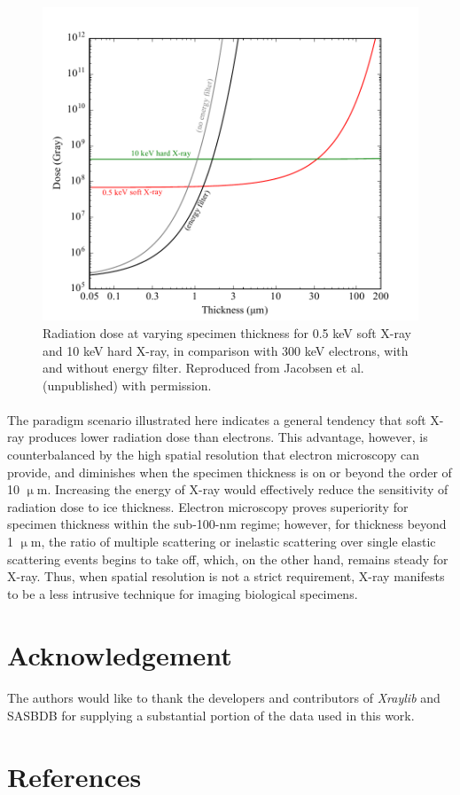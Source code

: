 \documentclass[review]{elsarticle}
\newcommand\micron{$\upmu$m}
\begin{document}
\begin{figure}[t!]
\begin{center}
\includegraphics[scale=0.7]{dose.pdf}
\caption{Radiation dose at varying specimen thickness for 0.5 keV soft X-ray and 10 keV hard X-ray, in comparison with 300 keV electrons, with and without energy filter. Reproduced from Jacobsen et al. (unpublished) with permission.}
\label{fig:dose}
\end{center}
\end{figure}

\paragraph{} The paradigm scenario illustrated here indicates a general tendency that soft X-ray produces lower radiation dose than electrons. This advantage, however, is counterbalanced by the high spatial resolution that electron microscopy can provide, and diminishes when the specimen thickness is on or beyond the order of 10 \micron. Increasing the energy of X-ray would effectively reduce the sensitivity of radiation dose to ice thickness. Electron microscopy proves superiority for specimen thickness within the sub-100-nm regime; however, for thickness beyond 1 \micron, the ratio of multiple scattering or inelastic scattering over single elastic scattering events begins to take off, which, on the other hand, remains steady for X-ray. Thus, when spatial resolution is not a strict requirement, X-ray manifests to be a less intrusive technique for imaging biological specimens. 



\section{Acknowledgement}
\paragraph{} The authors would like to thank the developers and contributors of \textit{Xraylib} and SASBDB for supplying a substantial portion of the data used in this work. 

\section*{References}

{}
\end{document}
